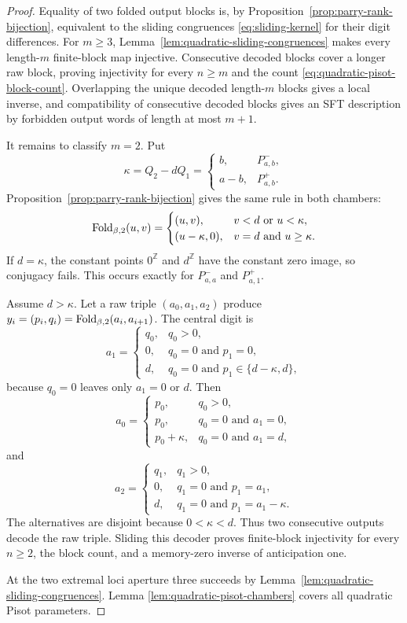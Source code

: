 \begin{proof}
Equality of two folded output blocks is, by
Proposition~\ref{prop:parry-rank-bijection}, equivalent to the sliding
congruences \eqref{eq:sliding-kernel} for their digit differences.  For
$m\ge3$, Lemma~\ref{lem:quadratic-sliding-congruences} makes every
length-$m$ finite-block map injective.  Consecutive decoded blocks cover a
longer raw block, proving injectivity for every $n\ge m$ and the count
\eqref{eq:quadratic-pisot-block-count}.  Overlapping the unique decoded
length-$m$ blocks gives a local inverse, and compatibility of consecutive
decoded blocks gives an SFT description by forbidden output words of length
at most $m+1$.

It remains to classify $m=2$.  Put
\[
\kappa=Q_2-dQ_1=
\begin{cases}b,&P^-_{a,b},\\ a-b,&P^+_{a,b}.\end{cases}
\]
Proposition~\ref{prop:parry-rank-bijection} gives the same rule in both
chambers:
\[
\mathrm{Fold}_{\beta,2}(u,v)=
\begin{cases}
(u,v),&v<d\text{ or }u<\kappa,\\
(u-\kappa,0),&v=d\text{ and }u\ge\kappa.
\end{cases}
\]
If $d=\kappa$, the constant points $0^{\mathbb Z}$ and $d^{\mathbb Z}$
have the constant zero image, so conjugacy fails.  This occurs exactly for
$P^-_{a,a}$ and $P^+_{a,1}$.

Assume $d>\kappa$.  Let a raw triple $(a_0,a_1,a_2)$ produce
$y_i=(p_i,q_i)=\mathrm{Fold}_{\beta,2}(a_i,a_{i+1})$.  The central digit is
\begin{equation}
a_1=
\begin{cases}
q_0,&q_0>0,\\
0,&q_0=0\text{ and }p_1=0,\\
d,&q_0=0\text{ and }p_1\in\{d-\kappa,d\},
\end{cases}
\label{eq:m2-central-decoder}
\end{equation}
because $q_0=0$ leaves only $a_1=0$ or $d$.  Then
\begin{equation}
a_0=
\begin{cases}
p_0,&q_0>0,\\
p_0,&q_0=0\text{ and }a_1=0,\\
p_0+\kappa,&q_0=0\text{ and }a_1=d,
\end{cases}
\label{eq:m2-left-decoder}
\end{equation}
and
\begin{equation}
a_2=
\begin{cases}
q_1,&q_1>0,\\
0,&q_1=0\text{ and }p_1=a_1,\\
d,&q_1=0\text{ and }p_1=a_1-\kappa.
\end{cases}
\label{eq:m2-right-decoder}
\end{equation}
The alternatives are disjoint because $0<\kappa<d$.  Thus two consecutive
outputs decode the raw triple.  Sliding this decoder proves finite-block
injectivity for every $n\ge2$, the block count, and a memory-zero inverse of
anticipation one.

At the two extremal loci aperture three succeeds by
Lemma~\ref{lem:quadratic-sliding-congruences}.  Lemma
\ref{lem:quadratic-pisot-chambers} covers all quadratic Pisot parameters.
\end{proof}

